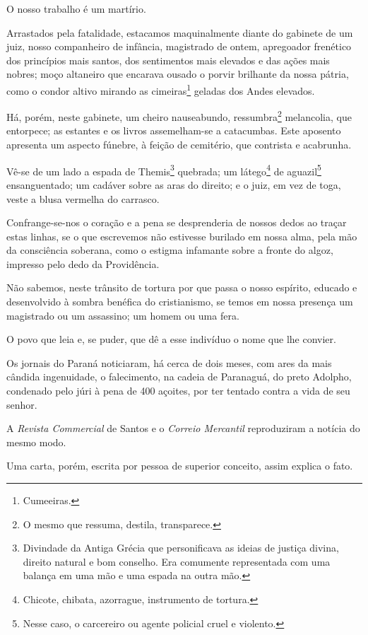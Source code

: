 O nosso trabalho é um martírio.

Arrastados pela fatalidade, estacamos maquinalmente diante do gabinete
de um juiz, nosso companheiro de infância, magistrado de ontem,
apregoador frenético dos princípios mais santos, dos sentimentos mais
elevados e das ações mais nobres; moço altaneiro que encarava ousado o
porvir brilhante da nossa pátria, como o condor altivo mirando as
cimeiras\footnote{Cumeeiras.} geladas dos Andes elevados.

Há, porém, neste gabinete, um cheiro nauseabundo, ressumbra\footnote{O
  mesmo que ressuma, destila, transparece.} melancolia, que entorpece;
as estantes e os livros assemelham-se a catacumbas. Este aposento
apresenta um aspecto fúnebre, à feição de cemitério, que contrista e
acabrunha.

Vê-se de um lado a espada de Themis\footnote{Divindade da Antiga
  Grécia que personificava as ideias de justiça divina, direito natural
  e bom conselho. Era comumente representada com uma balança em uma mão
  e uma espada na outra mão.} quebrada; um látego\footnote{Chicote,
  chibata, azorrague, instrumento de tortura.} de aguazil\footnote{
  Nesse caso, o carcereiro ou agente policial cruel e violento.}
ensanguentado; um cadáver sobre as aras do direito; e o juiz, em vez de
toga, veste a blusa vermelha do carrasco.

Confrange-se-nos o coração e a pena se desprenderia de nossos dedos ao
traçar estas linhas, se o que escrevemos não estivesse burilado em nossa
alma, pela mão da consciência soberana, como o estigma infamante sobre a
fronte do algoz, impresso pelo dedo da Providência.

Não sabemos, neste trânsito de tortura por que passa o nosso espírito,
educado e desenvolvido à sombra benéfica do cristianismo, se temos em
nossa presença um magistrado ou um assassino; um homem ou uma fera.

O povo que leia e, se puder, que dê a esse indivíduo o nome que lhe
convier.

Os jornais do Paraná noticiaram, há cerca de dois meses, com ares da
mais cândida ingenuidade, o falecimento, na cadeia de Paranaguá, do
preto Adolpho, condenado pelo júri à pena de 400 açoites, por ter
tentado contra a vida de seu senhor.

A \emph{Revista Commercial} de Santos e o \emph{Correio Mercantil}
reproduziram a notícia do mesmo modo.

Uma carta, porém, escrita por pessoa de superior conceito, assim explica
o fato.

